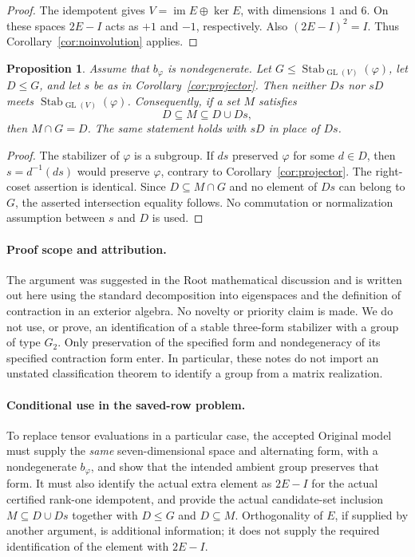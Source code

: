 \documentclass[11pt]{article}
\newtheorem{proposition}[theorem]{Proposition}
\newcommand{\Stab}{\operatorname{Stab}}
\newcommand{\im}{\operatorname{im}}
\begin{document}
\begin{proof}
The idempotent gives $V=\im E\oplus\ker E$, with dimensions $1$ and $6$.
On these spaces $2E-I$ acts as $+1$ and $-1$, respectively. Also
$(2E-I)^2=I$. Thus Corollary~\ref{cor:noinvolution} applies.
\end{proof}

\begin{proposition}\label{prop:coset}
Assume that $b_\varphi$ is nondegenerate. Let
$G\leq\Stab_{\operatorname{GL}(V)}(\varphi)$, let $D\leq G$, and let $s$ be
as in Corollary~\ref{cor:projector}. Then neither $Ds$ nor $sD$ meets
$\Stab_{\operatorname{GL}(V)}(\varphi)$. Consequently, if a set $M$ satisfies
\[
 D\subseteq M\subseteq D\cup Ds,
\]
then $M\cap G=D$. The same statement holds with $sD$ in place of $Ds$.
\end{proposition}

\begin{proof}
The stabilizer of $\varphi$ is a subgroup. If $ds$ preserved $\varphi$ for
some $d\in D$, then $s=d^{-1}(ds)$ would preserve $\varphi$, contrary to
Corollary~\ref{cor:projector}. The right-coset assertion is identical. Since
$D\subseteq M\cap G$ and no element of $Ds$ can belong to $G$, the asserted
intersection equality follows. No commutation or normalization assumption
between $s$ and $D$ is used.
\end{proof}

\paragraph{Proof scope and attribution.}
The argument was suggested in the Root mathematical discussion and is
written out here using the standard decomposition into eigenspaces and the
definition of contraction in an exterior algebra. No novelty or priority
claim is made. We do not use, or prove, an identification of a stable
three-form stabilizer with a group of type $G_2$. Only preservation of the
specified form and nondegeneracy of its specified contraction form enter.
In particular, these notes do not import an unstated classification theorem
to identify a group from a matrix realization.

\paragraph{Conditional use in the saved-row problem.}
To replace tensor evaluations in a particular case, the accepted Original
model must supply the \emph{same} seven-dimensional space and alternating
form, with a nondegenerate $b_\varphi$, and show that the intended ambient
group preserves that form. It must also identify the actual extra element
as $2E-I$ for the actual certified rank-one idempotent, and provide the actual
candidate-set inclusion $M\subseteq D\cup Ds$ together with $D\leq G$ and
$D\subseteq M$. Orthogonality of $E$, if supplied by another argument, is
additional information; it does not supply the required identification of
the element with $2E-I$.
\end{document}

